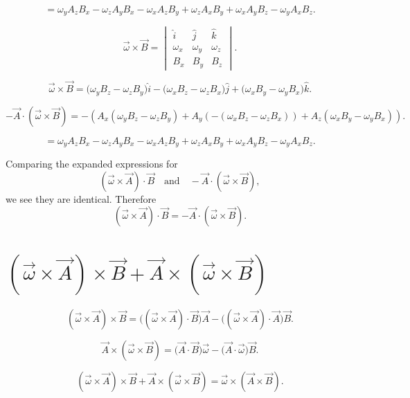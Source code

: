 \documentclass[letter, 10pts]{article}
\begin{document}
\[
= \omega_y A_z B_x - \omega_z A_y B_x - \omega_x A_z B_y + \omega_z A_x B_y + \omega_x A_y B_z - \omega_y A_x B_z.
\]

\[
\vec{\omega} \times \vec{B} = 
\begin{vmatrix}
\hat{i} & \hat{j} & \hat{k} \\
\omega_x & \omega_y & \omega_z \\
B_x & B_y & B_z
\end{vmatrix}.
\]

\[
\vec{\omega} \times \vec{B} = \big( \omega_y B_z - \omega_z B_y \big)\hat{i} - \big( \omega_x B_z - \omega_z B_x \big)\hat{j} + \big( \omega_x B_y - \omega_y B_x \big)\hat{k}.
\]


\[
-\vec{A} \cdot (\vec{\omega} \times \vec{B}) = -\left(A_x (\omega_y B_z - \omega_z B_y) + A_y (-(\omega_x B_z - \omega_z B_x)) + A_z (\omega_x B_y - \omega_y B_x)\right).
\]


\[
= \omega_y A_z B_x - \omega_z A_y B_x - \omega_x A_z B_y + \omega_z A_x B_y + \omega_x A_y B_z - \omega_y A_x B_z.
\]

Comparing the expanded expressions for
\[
(\vec{\omega} \times \vec{A}) \cdot \vec{B} \quad \text{and} \quad -\vec{A} \cdot (\vec{\omega} \times \vec{B}),
\]
we see they are identical. Therefore
\[
(\vec{\omega} \times \vec{A}) \cdot \vec{B} = -\vec{A} \cdot (\vec{\omega} \times \vec{B}).
\]


\section*{$(\vec{\omega} \times \vec{A} ) \times  \vec{B} + \vec{A} \times  (\vec{\omega} \times \vec{B})$}

\[
(\vec{\omega} \times \vec{A}) \times \vec{B} = \big((\vec{\omega} \times \vec{A}) \cdot \vec{B}\big) \vec{A} - \big((\vec{\omega} \times \vec{A}) \cdot \vec{A}\big) \vec{B}.
\]


\[
\vec{A} \times (\vec{\omega} \times \vec{B}) = \big(\vec{A} \cdot \vec{B}\big) \vec{\omega} - \big(\vec{A} \cdot \vec{\omega}\big) \vec{B}.
\]

\[
(\vec{\omega} \times \vec{A}) \times \vec{B} + \vec{A} \times (\vec{\omega} \times \vec{B}) = \vec{\omega} \times (\vec{A} \times \vec{B}).
\]
\end{document}
